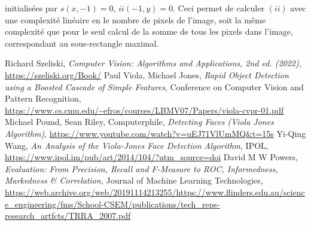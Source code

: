\documentclass[12pt,a4paper]{article}
\begin{document}
initialisées par $s(x, -1) = 0$, $ii(-1, y) = 0$. Ceci permet de calculer $(ii)$ avec une complexité linéaire en le nombre de pixels de l'image, soit la même complexité que pour le seul calcul de la somme de tous les pixels dans l'image, correspondant au sous-rectangle maximal.

\begin{thebibliography}{5}
    
    Richard Szeliski, \textit{Computer Vision: Algorithms and Applications, 2nd ed. (2022)}, \url{https://szeliski.org/Book/}
    Paul Viola, Michael Jones, \textit{Rapid Object Detection using a Boosted Cascade of Simple Features}, Conference on Computer Vision and Pattern Recognition, \url{https://www.cs.cmu.edu/~efros/courses/LBMV07/Papers/viola-cvpr-01.pdf}
    Michael Pound, Sean Riley, Computerphile, \textit{Detecting Faces (Viola Jones Algorithm)}, \url{https://www.youtube.com/watch?v=uEJ71VlUmMQ&t=15s}
    Yi-Qing Wang, \textit{An Analysis of the Viola-Jones Face Detection Algorithm}, IPOL, \url{https://www.ipol.im/pub/art/2014/104/?utm_source=doi}
    David M W Powers, \textit{Evaluation: From Precision, Recall and F-Measure to ROC, Informedness, Markedness \& Correlation}, Journal of Machine Learning Technologies,  \url{https://web.archive.org/web/20191114213255/https://www.flinders.edu.au/science_engineering/fms/School-CSEM/publications/tech_reps-research_artfcts/TRRA_2007.pdf}


\end{thebibliography}
\end{document}
